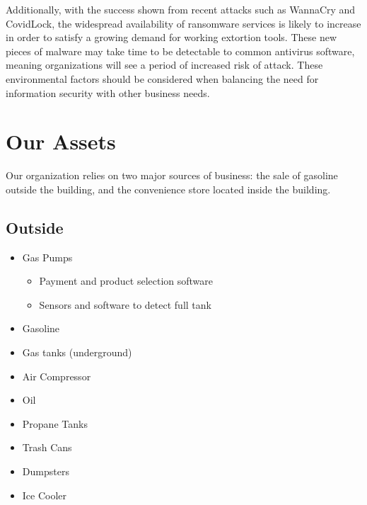 \documentclass[11pt]{article}
\begin{document}
Additionally, with the success shown from recent attacks such as WannaCry and CovidLock, the widespread availability of ransomware services is likely to increase in order to satisfy a growing demand for working extortion tools. These new pieces of malware may take time to be detectable to common antivirus software, meaning organizations will see a period of increased risk of attack. These environmental factors should be considered when balancing the need for information security with other business needs.

\section{Our Assets}
\label{sec:orge5ce709}
Our organization relies on two major sources of business: the sale of gasoline outside the building, and the convenience store located inside the building.

\subsection{Outside}
\label{sec:org5e5fa5e}
\begin{itemize}
\item Gas Pumps
\begin{itemize}
\item Payment and product selection software
\item Sensors and software to detect full tank
\end{itemize}
\item Gasoline
\item Gas tanks (underground)
\item Air Compressor
\item Oil
\item Propane Tanks
\item Trash Cans
\item Dumpsters
\item Ice Cooler
\end{itemize}
\end{document}
